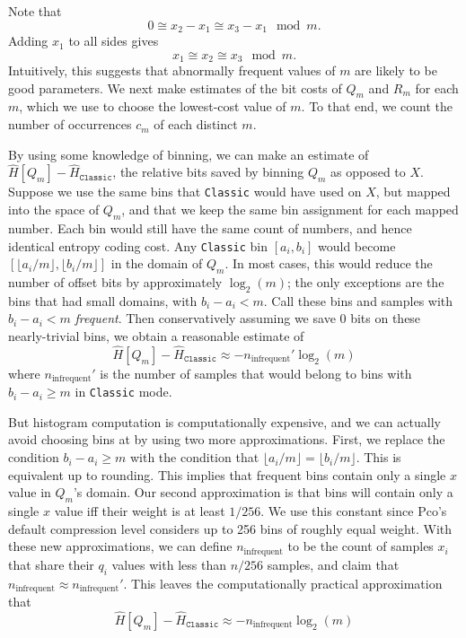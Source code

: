 \documentclass[letterpaper]{article}
\begin{document}
Note that
\[0 \cong x_2 - x_1 \cong x_3 - x_1 \mod m.\]
Adding $x_1$ to all sides gives
\[x_1 \cong x_2 \cong x_3 \mod m.\]
Intuitively, this suggests that abnormally frequent values of $m$ are likely to be good parameters.
We next make estimates of the bit costs of $Q_m$ and $R_m$ for each $m$, which we use to choose the lowest-cost value of $m$.
To that end, we count the number of occurrences $c_m$ of each distinct $m$.

By using some knowledge of binning, we can make an estimate of $\hat{H}[Q_m] - \hat{H}_\texttt{Classic}$, the relative bits saved by binning $Q_m$ as opposed to $X$.
Suppose we use the same bins that \texttt{Classic} would have used on $X$, but mapped into the space of $Q_m$, and that we keep the same bin assignment for each mapped number.
Each bin would still have the same count of numbers, and hence identical entropy coding cost.
Any \texttt{Classic} bin $[a_i, b_i]$ would become $[\lfloor a_i/m\rfloor, \lfloor b_i/m\rfloor]$ in the domain of $Q_m$.
In most cases, this would reduce the number of offset bits by approximately $\log_2(m)$; the only exceptions are the bins that had small domains, with $b_i - a_i < m$.
Call these bins and samples with $b_i - a_i < m$ \emph{frequent}.
Then conservatively assuming we save 0 bits on these nearly-trivial bins, we obtain a reasonable estimate of
\[\hat{H}[Q_m] - \hat{H}_\texttt{Classic} \approx -n_\text{infrequent}'\log_2(m)\]
where $n_\text{infrequent}'$ is the number of samples that would belong to bins with $b_i - a_i \ge m$ in \texttt{Classic} mode.

But histogram computation is computationally expensive, and we can actually avoid choosing bins at by using two more approximations.
First, we replace the condition $b_i - a_i \ge m$ with the condition that $\lfloor a_i / m\rfloor = \lfloor b_i / m\rfloor$.
This is equivalent up to rounding.
This implies that frequent bins contain only a single $x$ value in $Q_m$'s domain.
Our second approximation is that bins will contain only a single $x$ value iff their weight is at least $1/256$.
We use this constant since Pco's default compression level considers up to 256 bins of roughly equal weight.
With these new approximations, we can define $n_\text{infrequent}$ to be the count of samples $x_i$ that share their $q_i$ values with less than $n/256$ samples, and claim that $n_\text{infrequent} \approx n_\text{infrequent}'$.
This leaves the computationally practical approximation that
\[\hat{H}[Q_m] - \hat{H}_\texttt{Classic} \approx -n_\text{infrequent}\log_2(m)\]
\end{document}
